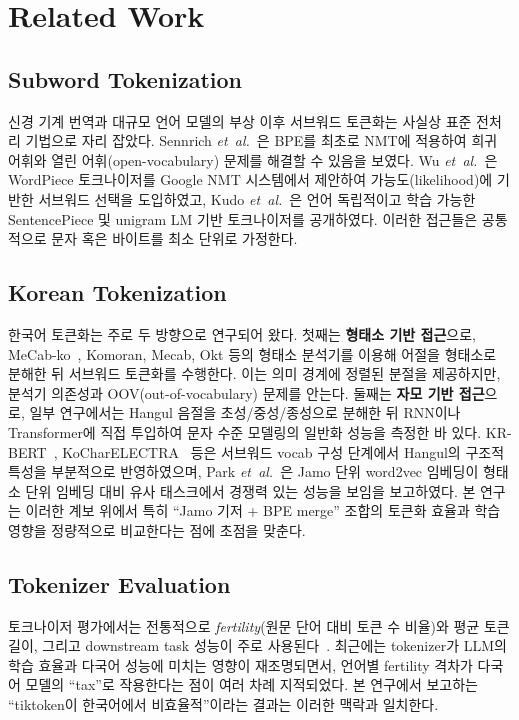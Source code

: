 \documentclass[sigconf,nonacm]{acmart}
\begin{document}
\section{Related Work}
\label{sec:related}

\subsection{Subword Tokenization}

신경 기계 번역과 대규모 언어 모델의 부상 이후 서브워드 토큰화는 사실상 표준 전처리 기법으로
자리 잡았다. Sennrich \emph{et~al.}~\cite{sennrich2016bpe}은 BPE를 최초로 NMT에 적용하여
희귀 어휘와 열린 어휘(open-vocabulary) 문제를 해결할 수 있음을 보였다.
Wu \emph{et~al.}~\cite{wu2016google}은 WordPiece 토크나이저를 Google NMT 시스템에서 제안하여
가능도(likelihood)에 기반한 서브워드 선택을 도입하였고, Kudo \emph{et~al.}~\cite{kudo2018sentencepiece}은
언어 독립적이고 학습 가능한 SentencePiece 및 unigram LM 기반 토크나이저를 공개하였다.
이러한 접근들은 공통적으로 문자 혹은 바이트를 최소 단위로 가정한다.

\subsection{Korean Tokenization}

한국어 토큰화는 주로 두 방향으로 연구되어 왔다.
첫째는 \textbf{형태소 기반 접근}으로, MeCab-ko~\cite{mecabko}, Komoran, Mecab, Okt 등의 형태소 분석기를
이용해 어절을 형태소로 분해한 뒤 서브워드 토큰화를 수행한다. 이는 의미 경계에 정렬된 분절을
제공하지만, 분석기 의존성과 OOV(out-of-vocabulary) 문제를 안는다.
둘째는 \textbf{자모 기반 접근}으로, 일부 연구에서는 Hangul 음절을 초성/중성/종성으로 분해한 뒤
RNN이나 Transformer에 직접 투입하여 문자 수준 모델링의 일반화 성능을 측정한 바 있다.
KR-BERT~\cite{krbert}, KoCharELECTRA~\cite{kocharelectra} 등은 서브워드 vocab 구성 단계에서 Hangul의
구조적 특성을 부분적으로 반영하였으며, Park \emph{et~al.}~\cite{park2020jamo}은 Jamo 단위
word2vec 임베딩이 형태소 단위 임베딩 대비 유사 태스크에서 경쟁력 있는 성능을 보임을 보고하였다.
본 연구는 이러한 계보 위에서 특히 ``Jamo 기저 + BPE merge'' 조합의 토큰화 효율과 학습 영향을
정량적으로 비교한다는 점에 초점을 맞춘다.

\subsection{Tokenizer Evaluation}

토크나이저 평가에서는 전통적으로 \emph{fertility}(원문 단어 대비 토큰 수 비율)와 평균 토큰 길이,
그리고 downstream task 성능이 주로 사용된다~\cite{rust2021multilingualtok}. 최근에는
tokenizer가 LLM의 학습 효율과 다국어 성능에 미치는 영향이 재조명되면서, 언어별 fertility 격차가
다국어 모델의 ``tax''로 작용한다는 점이 여러 차례 지적되었다. 본 연구에서 보고하는
``tiktoken이 한국어에서 비효율적''이라는 결과는 이러한 맥락과 일치한다.
\end{document}

